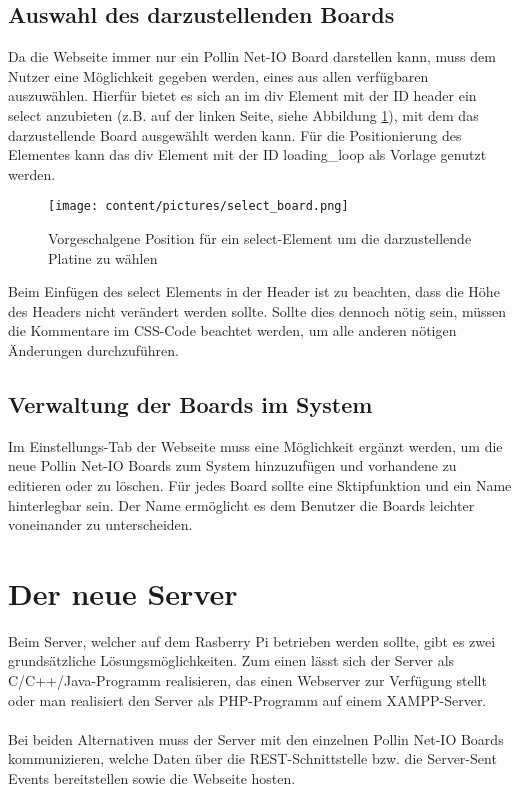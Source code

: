 \subsection{Auswahl des darzustellenden Boards}
\label{auswahl_board}
Da die Webseite immer nur ein Pollin Net-IO Board darstellen kann, muss dem
Nutzer eine Möglichkeit gegeben werden, eines aus allen verfügbaren auszuwählen.
Hierfür bietet es sich an im \textrm{div} Element mit der ID \textrm{header}
ein \textrm{select} anzubieten (z.B. auf der linken Seite, siehe
Abbildung \ref{select_board}), mit dem das darzustellende Board ausgewählt
werden kann.
Für die Positionierung des Elementes kann das \textrm{div} Element mit der ID
\textrm{loading\_loop} als Vorlage genutzt werden.

\begin{figure}[H]
\centering
\texttt{[image: content/pictures/select\_board.png]}
\caption[Select Element]{Vorgeschalgene Position für ein select-Element um die
darzustellende Platine zu wählen}
\label{select_board}
\end{figure}

Beim Einfügen des \textrm{select} Elements in der Header ist zu beachten, dass die
Höhe des Headers nicht verändert werden sollte. Sollte dies dennoch nötig sein,
müssen die Kommentare im CSS-Code beachtet werden, um alle anderen nötigen
Änderungen durchzuführen.

\subsection{Verwaltung der Boards im System}
\label{verwaltung_system}
Im Einstellungs-Tab der Webseite muss eine Möglichkeit ergänzt werden, um die
neue Pollin Net-IO Boards zum System hinzuzufügen und vorhandene zu editieren
oder zu löschen. Für jedes Board sollte eine Sktipfunktion und ein Name
hinterlegbar sein. Der Name ermöglicht es dem Benutzer die Boards leichter
voneinander zu unterscheiden.

\section{Der neue Server}
Beim Server, welcher auf dem Rasberry Pi betrieben werden sollte, gibt es zwei
grundsätzliche Lösungsmöglichkeiten. Zum einen lässt sich der Server als
C/C++/Java-Programm realisieren, das einen Webserver zur Verfügung stellt oder
man realisiert den Server als PHP-Programm auf einem XAMPP-Server.\\
\\
Bei beiden Alternativen muss der Server mit den einzelnen Pollin Net-IO Boards
kommunizieren, welche Daten über die REST-Schnittstelle bzw. die Server-Sent Events
bereitstellen sowie die Webseite hosten.

